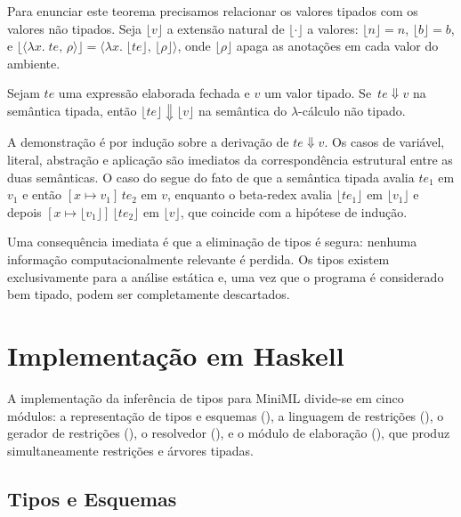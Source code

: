   Para enunciar este teorema precisamos relacionar os valores tipados com
  os valores não tipados. Seja \(\lfloor v \rfloor\) a extensão natural de
  \(\lfloor \cdot \rfloor\) a valores: \(\lfloor n \rfloor = n\),
  \(\lfloor b \rfloor = b\), e \(\lfloor \langle \lambda x.\; te,\, \rho
  \rangle \rfloor = \langle \lambda x.\; \lfloor te \rfloor,\, \lfloor
  \rho \rfloor \rangle\), onde \(\lfloor \rho \rfloor\) apaga as anotações
  em cada valor do ambiente.

  \begin{Theorem}
    Sejam \(te\) uma expressão elaborada fechada e \(v\) um valor tipado.
    Se \(\,te \Downarrow v\) na semântica tipada, então \(\lfloor te
    \rfloor \Downarrow \lfloor v \rfloor\) na semântica do $\lambda$-cálculo
    não tipado.
  \end{Theorem}

  A demonstração é por indução sobre a derivação de \(te \Downarrow v\). Os
  casos de variável, literal, abstração e aplicação são imediatos da
  correspondência estrutural entre as duas semânticas. O caso do
   segue do fato de que a semântica tipada avalia \(te_1\)
  em \(v_1\) e então \([x \mapsto v_1]\,te_2\) em \(v\), enquanto o
  beta-redex avalia \(\lfloor te_1 \rfloor\) em \(\lfloor v_1 \rfloor\) e
  depois \([x \mapsto \lfloor v_1 \rfloor]\,\lfloor te_2 \rfloor\) em
  \(\lfloor v \rfloor\), que coincide com a hipótese de indução.

  Uma consequência imediata é que a eliminação de tipos é segura: nenhuma
  informação computacionalmente relevante é perdida. Os tipos existem
  exclusivamente para a análise estática e, uma vez que o programa é
  considerado bem tipado, podem ser completamente descartados.

  \section{Implementação em Haskell}

  A implementação da inferência de tipos para MiniML divide-se em cinco
  módulos: a representação de tipos e esquemas
  (), a linguagem de restrições
  (), o gerador de restrições
  (), o resolvedor
  (), e o módulo de elaboração
  (), que produz simultaneamente
  restrições e árvores tipadas.

  \subsection{Tipos e Esquemas}

